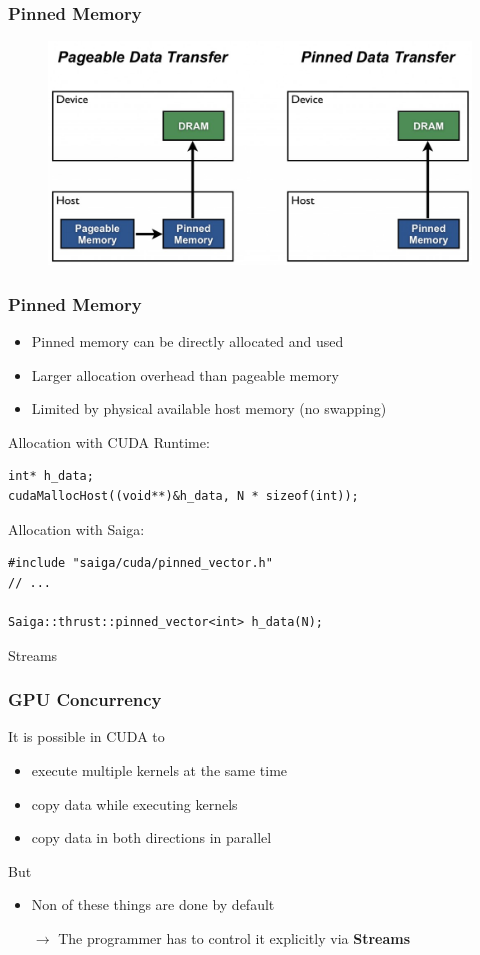 \documentclass[aspectratio=169,handout]{beamer}
\begin{document}
\begin{frame}[fragile]
\frametitle{Pinned Memory}

		\begin{figure}
	\includegraphics[height=0.7\textheight]{pinnend}
\end{figure}

\end{frame}


\begin{frame}[fragile]
\frametitle{Pinned Memory}
\begin{itemize}
	\item Pinned memory can be directly allocated and used
	\item Larger allocation overhead than pageable memory
	\item Limited by physical available host memory (no swapping)
\end{itemize}
Allocation with CUDA Runtime:
\begin{lstlisting}
int* h_data;
cudaMallocHost((void**)&h_data, N * sizeof(int));
\end{lstlisting}
Allocation with Saiga:
\begin{lstlisting}
#include "saiga/cuda/pinned_vector.h"
// ...

Saiga::thrust::pinned_vector<int> h_data(N);
\end{lstlisting}
\end{frame}



\frame
{
\begin{center}
\Large Streams
\end{center}
}



\frame
{
	\frametitle{GPU Concurrency}
	It is possible in CUDA to
	\begin{itemize}
		\item execute multiple kernels at the same time
		\item copy data while executing kernels
		\item copy data in both directions in parallel
	\end{itemize}
	But
	\begin{itemize}
		\item Non of these things are done by default
		\item[$\rightarrow$] The programmer has to control it explicitly via \textbf{Streams}
	\end{itemize}
}
\end{document}
